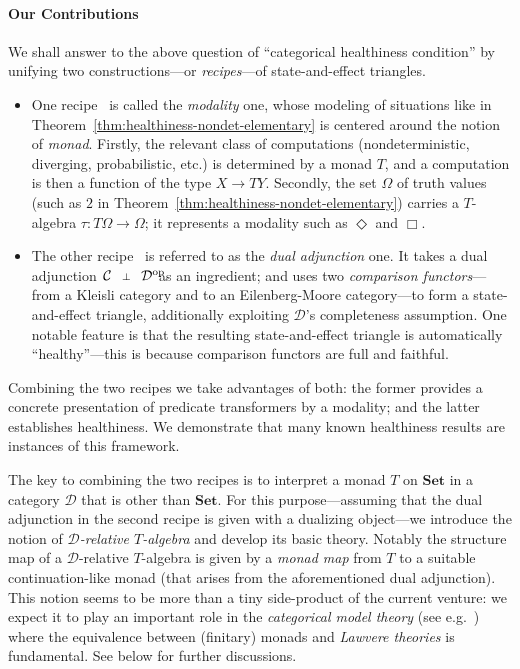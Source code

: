 \documentclass[9pt, preprint]{sigplanconf}
\theoremstyle{theorem}
\theoremstyle{definition}
\newcommand{\cat}[1]{\mathcal{#1}}
\newcommand{\op}{\mathrm{op}}
\newcommand{\Set}{\mathbf{Set}}
\newcommand{\Sets}{\Set}
\begin{document}
\paragraph{Our Contributions}
We shall answer to the above question of ``categorical healthiness
condition'' by unifying two constructions---or \emph{recipes}---of
state-and-effect triangles.
\begin{itemize}
 \item One recipe~\cite{Hasuo14,Hasuo15TCS} is called the \emph{modality} one,
       whose modeling of situations like in
       Theorem~\ref{thm:healthiness-nondet-elementary} is centered
       around the notion of \emph{monad}. Firstly,
       the relevant class of
       computations (nondeterministic, diverging,
       probabilistic, etc.) is determined by a monad $T$, and
       a computation is then a function of the type $X\to TY$. Secondly,
              the set $\Omega$ of truth values (such as $2$
       in Theorem~\ref{thm:healthiness-nondet-elementary})
carries a $T$-algebra
       $\tau\colon T\Omega\to\Omega$; it represents a modality such
       as $\Diamond$ and $\Box$.
 \item The other recipe~\cite{Jacobs15CALCO} is referred to as the
       \emph{dual adjunction} one. It takes a dual adjunction
       \begin{math}
		\xymatrix@1@C-.5em{
	 {\cat{C}}
\ar@/^1ex/[r]\ar@{}[r]|-{\bot}
        &
	 {\cat{D}\rlap{$^{\op}$}
}
	   \ar@/^1ex/[l]}
       \end{math}\quad
       as an ingredient; and uses two \emph{comparison functors}---from
       a Kleisli category and to an Eilenberg-Moore category---to form a
       state-and-effect triangle, additionally exploiting $\cat{D}$'s
       completeness assumption. One notable feature is that the
       resulting state-and-effect triangle is automatically
       ``healthy''---this is because comparison functors are full and
       faithful.
\end{itemize}
Combining the two recipes we take advantages of both: the former
provides a concrete presentation of predicate transformers by a
modality; and the latter establishes healthiness.  We demonstrate that
many known healthiness results are instances of this framework.

The key to combining the two recipes is to interpret a
monad $T$ on $\Sets$ in a category $\cat{D}$ that is other than
$\Sets$. For this purpose---assuming that the dual adjunction in the
second recipe is given with a dualizing
object---we introduce the notion of \emph{$\cat{D}$-relative $T$-algebra}
and develop its basic theory. Notably the structure map of a $\cat{D}$-relative $T$-algebra  is given by a \emph{monad map} from $T$ to a suitable
continuation-like monad (that arises from the aforementioned dual
adjunction). This notion seems to be more than a tiny side-product of the
current venture: we expect it to play an important role in the
\emph{categorical model theory} (see e.g.~\cite{AdamekR94,LackP09,MakkaiP89}) where the
equivalence between (finitary) monads and \emph{Lawvere theories} is
fundamental. See below for further discussions.
\end{document}
